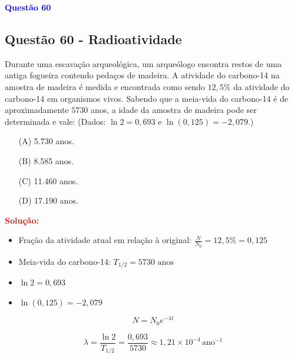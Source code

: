 \begin{flushleft}
\textbf{\textcolor{blue}{\Large Quest\~ao 60}}\\
\noindent
\subsection{Quest\~ao 60 - Radioatividade}
Durante uma escavação arqueológica, um arqueólogo encontra restos de uma antiga fogueira contendo pedaços de madeira.  
A atividade do carbono-14 na amostra de madeira é medida e encontrada como sendo \(12{,}5\%\) da atividade do carbono-14 em organismos vivos.  
Sabendo que a meia-vida do carbono-14 é de aproximadamente \(5730\) anos, a idade da amostra de madeira pode ser determinada e vale:  
(Dados: \(\ln 2 = 0{,}693\) e \(\ln(0{,}125) = -2{,}079\).)

\begin{itemize}
\item[(A)] 5.730 anos.
\item[(B)] 8.585 anos.
\item[(C)] 11.460 anos.
\item[(D)] 17.190 anos.
\end{itemize}

\vspace{0.5cm}

\textcolor{red}{\textbf{Solução:}}\\


\begin{itemize}
    \item Fração da atividade atual em relação à original: \(\frac{N}{N_0} = 12{,}5\% = 0{,}125\)
    \item Meia-vida do carbono-14: \(T_{1/2} = 5730 \text{ anos}\)
    \item \(\ln 2 = 0{,}693\)
    \item \(\ln(0{,}125) = -2{,}079\)
\end{itemize}

\vspace{0.3cm}


\[
N = N_0 e^{-\lambda t}
\]


\vspace{0.3cm}


\[
\lambda = \frac{\ln 2}{T_{1/2}} = \frac{0{,}693}{5730} \approx 1{,}21 \times 10^{-4}\, \text{ano}^{-1}
\]


\end{flushleft}
